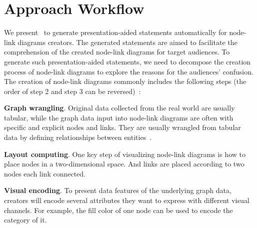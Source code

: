 \section{Approach Workflow}
We present \ApproachName~to generate presentation-aided statements automatically for node-link diagrams creators. The generated statements are aimed to facilitate the comprehension of the created node-link diagrams for target audiences.
To generate such presentation-aided statements, we need to decompose the creation process of node-link diagrams to explore the reasons for the audiences' confusion.
The creation of node-link diagrams commonly includes the following steps (the order of step 2 and step 3 can be reversed)~\cite{DBLP:journals/cgf/SpritzerBDFF15, tvcg/RomatAP21}:
\begin{compactenum}
    \item \textbf{Graph wrangling}. Original data collected from the real world are usually tabular, while the graph data input into node-link diagrams are often with specific and explicit nodes and links. They are usually wrangled from tabular data by defining relationships between entities~\cite{DBLP:journals/tvcg/SrinivasanPEB18, DBLP:conf/ieeevast/BigelowNML19}.
    \item \textbf{Layout computing}. One key step of visualizing node-link diagrams is how to place nodes in a two-dimensional space. And links are placed according to two nodes each link connected.
    \item \textbf{Visual encoding}. To present data features of the underlying graph data, creators will encode several attributes they want to express with different visual channels. For example, the fill color of one node can be used to encode the category of it.
\end{compactenum}

